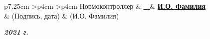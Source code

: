 \begin{titlepage}
\begin{table}[h!]
			\vspace{\baselineskip}

			\begin{signstabular}[0.7]{p{7.25cm} >{\centering\arraybackslash}p{4cm} >{\centering\arraybackslash}p{4cm}}
				Нормоконтроллер & \uline{\hfill \textbf{\ } \hfill} & \uline{\hfill \textbf{И.О. Фамилия} \hfill} \\
				& \scriptsize (Подпись, дата) & \scriptsize (И.О. Фамилия)
			\end{signstabular}
		\end{table}

		\begin{center}
			\normalsize \textit{\textbf{{2021} г.}}
		\end{center}
\end{titlepage}
